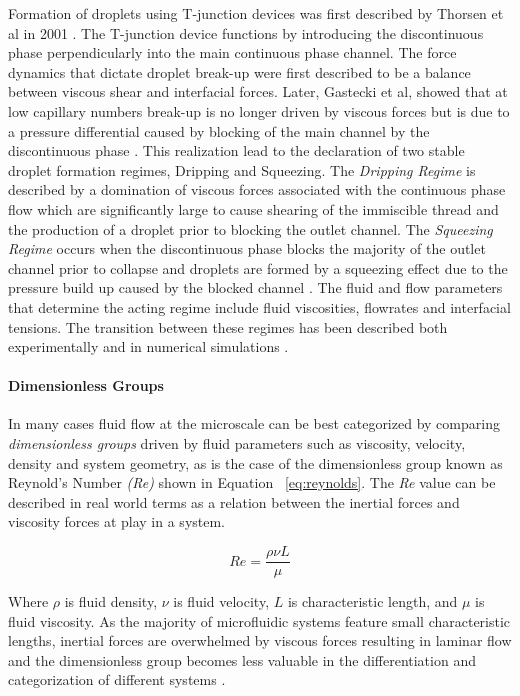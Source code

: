 Formation of droplets using T-junction devices was first described by Thorsen et al in 2001 \cite{Thorsen2001}. The T-junction device functions by introducing the discontinuous phase perpendicularly into the main continuous phase channel. The force dynamics that dictate droplet break-up were first described to be a balance between viscous shear and interfacial forces. Later, Gastecki et al, showed that at low capillary numbers break-up is no longer driven by viscous forces but is due to a pressure differential caused by blocking of the main channel by the discontinuous phase \cite{Garstecki2006}. This realization lead to the declaration of two stable droplet formation regimes, Dripping and Squeezing. The
\emph{Dripping Regime} is described by a domination of viscous forces associated with the continuous phase flow which are significantly large to cause shearing of the immiscible thread and the production of a droplet prior to blocking the outlet channel. The \emph{Squeezing Regime} occurs when the discontinuous phase blocks the majority of the outlet channel prior to collapse and droplets are formed by a squeezing effect due to the pressure build up caused by the blocked channel \cite{Shui2007a}. The fluid and flow parameters that determine the acting regime include fluid viscosities, flowrates and interfacial tensions. The transition between these regimes has been described both experimentally and in numerical simulations \cite{Christopher2008,DeMenech2008}. 

\paragraph{Dimensionless Groups} In many cases fluid flow at the microscale can be best categorized by comparing \emph{dimensionless groups} driven by fluid parameters such as viscosity, velocity, density and system geometry, as is the case of the dimensionless group known as Reynold's Number \emph{(Re)} shown in Equation ~\vref{eq:reynolds}. The \emph{Re} value can be described in real world terms as a relation between the inertial forces and viscosity forces at play in a system.

\begin{equation}
Re =\frac {\rho \nu L}{\mu}
\label{eq:reynolds}
\end{equation}

Where $\rho$ is fluid density, $\nu$ is fluid velocity, $L$ is characteristic length, and $\mu$ is fluid viscosity. As the majority of microfluidic systems feature small characteristic lengths, inertial forces are overwhelmed by viscous forces resulting in laminar flow and the dimensionless group becomes less valuable in the differentiation and categorization of different systems \cite{Kleinstreuer2013}.

